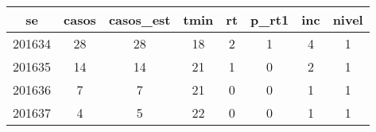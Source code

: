 \begin{tabular}{c|ccccccc}
  \hline
se & casos & casos\_est & tmin & rt & p\_rt1 & inc & nivel \\ 
  \hline
201634 & 28 & 28 & 18 & 2 & 1 & 4 & 1 \\ 
  201635 & 14 & 14 & 21 & 1 & 0 & 2 & 1 \\ 
  201636 & 7 & 7 & 21 & 0 & 0 & 1 & 1 \\ 
  201637 & 4 & 5 & 22 & 0 & 0 & 1 & 1 \\ 
   \hline
\end{tabular}

